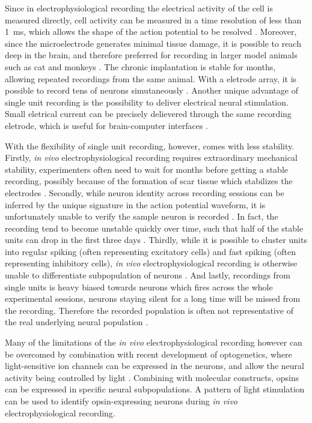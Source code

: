 Since in electrophysiological recording the electrical activity of the cell is measured directly, cell activity can be measured in a time resolution of less than \SI{1}{\ms}, which allows the shape of the action potential to be resolved \citep{lutcke13}. Moreover, since the microelectrode generates minimal tissue damage, it is possible to reach deep in the brain, and therefore preferred for recording in larger model animals such as cat and monkeys \citep{lutcke13}. The chronic implantation is stable for months, allowing repeated recordings from the same animal. With a eletrode array, it is possible to record tens of neurons simutaneously \citep{lutcke13}. Another unique advantage of single unit recording is the possibility to deliver electrical neural stimulation. Small eletrical current can be precisely delievered through the same recording eletrode, which is useful for brain-computer interfaces \citep{hatsopoulos09}. 

With the flexibility of single unit recording, however, comes with less stability. Firstly, \textit{in vivo} electrophysiological recording requires extraordinary mechanical stability, experimenters often need to wait for months before getting a stable recording, possibly because of the formation of scar tissue which stabilizes the electrodes \citep{jackson07}. Secondly, while neuron identity across recording sessions can be inferred by the unique signature in the action potential waveform, it is unfortunately unable to verify the sample neuron is recorded \citep{rousche98, schmitzer-torbert04, tolias07}. In fact, the recording tend to become unstable quickly over time, such that half of the stable units can drop in the first three days \citep{fraser12}. Thirdly, while it is possible to cluster units into regular spiking (often representing excitatory cells) and fast spiking (often representing inhibitory cells), \textit{in vivo} electrophysiological recording is otherwise unable to differentiate subpopulation of neurons \citep{connors90}. And lastly, recordings from single units is heavy biased towards neurons which fires across the whole experimental sessions, neurons staying silent for a long time will be missed from the recording. Therefore the recorded population is often not representative of the real underlying neural population \citep{lutcke13}. 

Many of the limitations of the \textit{in vivo} electrophysiological recording however can be overcomed by combination with recent development of optogenetics, where light-sensitive ion channels can be expressed in the neurons, and allow the neural activity being controlled by light \citep{yizhar11}. Combining with molecular constructs, opsins can be expressed in specific neural subpopulations. A pattern of light stimulation can be used to identify opsin-expressing neurons during \textit{in vivo} electrophysiological recording\citep{zhao11}. 

